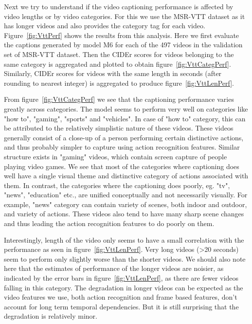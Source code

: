Next we try to understand if the video captioning performance is affected by
video lengths or by video categories.
For this we use the MSR-VTT dataset as it has longer videos and also provides
the category tag for each video.
Figure~\ref{fig:VttPerf} shows the results from this analysis.
Here we first evaluate the captions generated by model M6 for each of the 497 videos
in the validation set of MSR-VTT dataset.
Then the CIDEr scores for videos belonging to the same category is aggregated
and plotted to obtain figure~\ref{fig:VttCategPerf}.
Similarly, CIDEr scores for videos with the same length in seconds (after rounding to
nearest integer) is aggregated to produce figure~\ref{fig:VttLenPerf}.

From figure~\ref{fig:VttCategPerf} we see that the captioning performance varies
greatly across categories.
The model seems to perform very well on categories like "how to", "gaming",
"sports" and "vehicles".
In case of "how to" category, this can be attributed to the relatively
simplistic nature of these videos.
These videos generally consist of a close-up of a person performing certain
distinctive actions, and thus probably simpler to capture using action
recognition features. 
Similar structure exists in "gaming" videos, which contain screen capture of
people playing video games.
We see that most of the categories where captioning does well have a single
visual theme and distinctive category of actions associated with them. 
In contrast, the categories where the captioning does poorly, eg. "tv", "news",
"education" etc., are unified conceptually and not necessarily visually.
For example, "news" category can contain variety of scenes, both indoor and outdoor,
and variety of actions. 
These videos also tend to have many sharp scene changes and thus leading the action
recognition features to do poorly on them.

Interestingly, length of the video only seems to have a small correlation with
the performance as seen in figure~\ref{fig:VttLenPerf}.
Very long videos (>20 seconds) seem to perform only slightly worse than the shorter
videos.
We should also note here that the estimates of performance of the longer videos
are noisier, as indicated by the error bars in figure~\ref{fig:VttLenPerf}, as
there are fewer videos falling in this category. 
The degradation in longer videos can be expected as the video features we use,
both action recognition and frame based features, don't account for long term
temporal dependencies.
But it is still surprising that the degradation is relatively minor.

